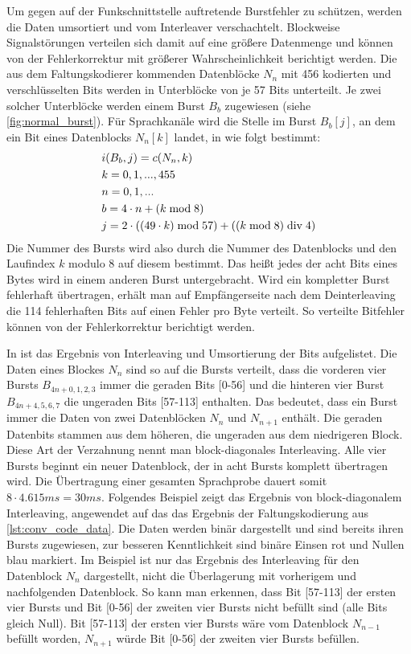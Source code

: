 Um gegen auf der Funkschnittstelle auftretende Burstfehler zu schützen, werden die Daten umsortiert und vom Interleaver verschachtelt. Blockweise Signalstörungen verteilen sich damit auf eine größere Datenmenge und können von der Fehlerkorrektur mit größerer Wahrscheinlichkeit berichtigt werden. Die aus dem Faltungskodierer kommenden Datenblöcke $N_n$ mit 456 kodierten und verschlüsselten Bits werden in Unterblöcke von je 57 Bits unterteilt. Je zwei solcher Unterblöcke werden einem Burst $B_b$ zugewiesen (siehe \autoref{fig:normal_burst}). Für Sprachkanäle wird die Stelle im Burst $B_b[j]$, an dem ein Bit eines Datenblocks $N_n[k]$ landet, in  wie folgt bestimmt:
\begin{align}
\begin{split}
& i(B_b,j) = c(N_n,k) \\
& k = 0,1,...,455 \\
& n = 0,1,... \\
& b = 4 \cdot n + \left(k \bmod 8\right) \\
& j = 2 \cdot \left(\left( 49 \cdot k \right) \bmod 57 \right) + \left(\left( k \bmod 8 \right) \bdiv 4 \right)
\end{split}
\end{align}
Die Nummer des Bursts wird also durch die Nummer des Datenblocks und den Laufindex $k$ modulo $8$ auf diesem bestimmt. Das heißt jedes der acht Bits eines Bytes wird in einem anderen Burst untergebracht. Wird ein kompletter Burst fehlerhaft übertragen, erhält man auf Empfängerseite nach dem Deinterleaving die 114 fehlerhaften Bits auf einen Fehler pro Byte verteilt. So verteilte Bitfehler können von der Fehlerkorrektur berichtigt werden.

In  ist das Ergebnis von Interleaving und Umsortierung der Bits aufgelistet. Die Daten eines Blockes $N_n$ sind so auf die Bursts verteilt, dass die vorderen vier Bursts $B_{4n + 0,1,2,3}$ immer die geraden Bits [0-56] und die hinteren vier Burst $B_{4n + 4,5,6,7}$ die ungeraden Bits [57-113] enthalten. Das bedeutet, dass ein Burst immer die Daten von zwei Datenblöcken $N_n$ und $N_{n + 1}$ enthält. Die geraden Datenbits stammen aus dem höheren, die ungeraden aus dem niedrigeren Block. Diese Art der Verzahnung nennt man block-diagonales Interleaving. Alle vier Bursts beginnt ein neuer Datenblock, der in acht Bursts komplett übertragen wird. Die Übertragung einer gesamten Sprachprobe dauert somit $8 \cdot 4.615 ms = 30 ms$. Folgendes Beispiel zeigt das Ergebnis von block-diagonalem Interleaving, angewendet auf das das Ergebnis der Faltungskodierung aus \autoref{lst:conv_code_data}. Die Daten werden binär dargestellt und sind bereits ihren Bursts zugewiesen, zur besseren Kenntlichkeit sind binäre Einsen rot und Nullen blau markiert. Im Beispiel ist nur das Ergebnis des Interleaving für den Datenblock $N_n$ dargestellt, nicht die Überlagerung mit vorherigem und nachfolgenden Datenblock. So kann man erkennen, dass Bit [57-113] der ersten vier Bursts und Bit [0-56] der zweiten vier Bursts nicht befüllt sind (alle Bits gleich Null). Bit [57-113] der ersten vier Bursts wäre vom Datenblock $N_{n-1}$ befüllt worden, $N_{n+1}$ würde Bit [0-56] der zweiten vier Bursts befüllen.\\

